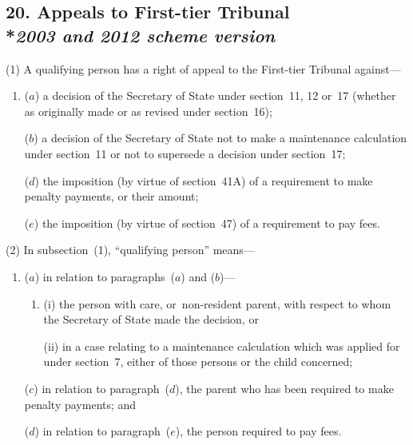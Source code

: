 \documentclass[12pt,a4paper]{article}
\begin{document}
\subsection[20. Appeals to 
First-tier Tribunal  %
--- \emph{2003 and 2012 scheme version}]{20. Appeals to 
First-tier Tribunal%
\\*\emph{2003 and 2012 scheme version}}

(1) A qualifying person has a right of appeal to 
the First-tier Tribunal  %
against—
\begin{enumerate}\item[]
($a$) a decision of the 
Secretary of State  %
under section~11, 12 or~17 (whether as originally made or as revised under section~16);

($b$) a decision of the 
Secretary of State  %
not to make a maintenance calculation under section~11 or not to supersede a decision under section~17;


($d$) the imposition (by virtue of section~41A) of a requirement to make penalty payments, or their amount;

($e$) the imposition (by virtue of section~47) of a requirement to pay fees.
\end{enumerate}

(2) In subsection~(1), “qualifying person” means—
\begin{enumerate}\item[]
($a$) in relation to paragraphs~($a$)  and ($b$)—
\begin{enumerate}\item[]
(i) the person with care, or~non-resident parent, with respect to whom the 
Secretary of State  %
made the decision, or

(ii) in a case relating to a maintenance calculation which was applied for under section~7, either of those persons or the child concerned;
\end{enumerate}


($c$) in relation to paragraph~($d$), the parent who has been required to make penalty payments; and

($d$) in relation to paragraph~($e$), the person required to pay fees.
\end{enumerate}
\end{document}
